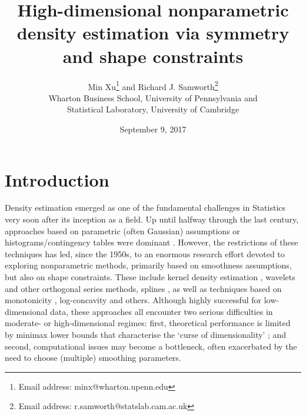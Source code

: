 \documentclass[a4paper,12pt]{article}
\title{High-dimensional nonparametric density estimation via symmetry and shape constraints}
\author{Min Xu\footnote{Email address: minx@wharton.upenn.edu} and Richard J. Samworth\footnote{Email address: r.samworth@statslab.cam.ac.uk} \\ Wharton Business School, University of Pennsylvania and \\
Statistical Laboratory, University of Cambridge}
\date{September 9, 2017}
\begin{document}
\maketitle





\section{Introduction}

Density estimation emerged as one of the fundamental challenges in Statistics very soon after its inception as a field.  Up until halfway through the last century, approaches based on parametric (often Gaussian) assumptions or histograms/contingency tables were dominant \citep{Fisher1922,Fisher1925}.  However, the restrictions of these techniques has led, since the 1950s, to an enormous research effort devoted to exploring nonparametric methods, primarily based on smoothness assumptions, but also on shape constraints.  These include kernel density estimation \citep{rosenblatt1956remarks,WandJones1995}, wavelets \citep{donoho1996density} and other orthogonal series methods, splines \citep{gu1993smoothing}, as well as techniques based on monotonicity \citep{grenander1956theory}, log-concavity \citep{CSS2010} and others.  Although highly successful for low-dimensional data, these approaches all encounter two serious difficulties in moderate- or high-dimensional regimes: first, theoretical performance is limited by minimax lower bounds that characterise the `curse of dimensionality' \citep[e.g.][]{ibragimov1983estimation}; and second, computational issues may become a bottleneck, often exacerbated by the need to choose (multiple) smoothing parameters.  
\end{document}
